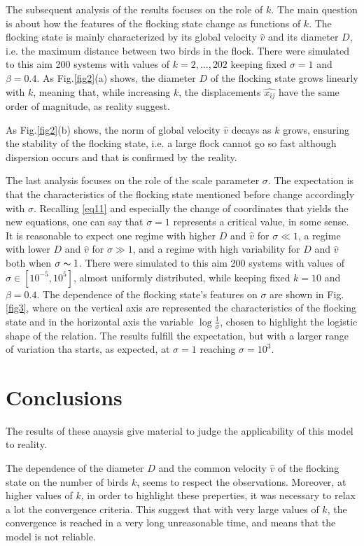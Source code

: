 \documentclass{article} %
\newcounter{late}
\begin{document}
The subsequent analysis of the results focuses on the role of $k$. The main question is about how 
the features of the flocking state change as functions of $k$. The flocking state is mainly
characterized by its global velocity $\widehat{v}$ and its diameter $D$, i.e. the maximum distance 
between two birds in the flock. There were simulated to this aim 200 systems with values of $k=2,...,202$ 
keeping fixed $\sigma=1$ and $\beta=0.4$.
As Fig.\ref{fig2}(a) shows, the diameter $D$ of the flocking state grows linearly with 
$k$, meaning that, 
while increasing $k$,
the displacements $\widehat{x_{ij}}$ have the same order of magnitude, as reality suggest.

As Fig.\ref{fig2}(b) shows, the norm of global velocity $\widehat{v}$ decays as $k$ grows, ensuring the stability 
of the flocking state, i.e. a large flock cannot go so fast although dispersion occurs and that is confirmed 
by the reality.

The last analysis focuses on the role of the scale parameter $\sigma$. The expectation is that 
the characteristics of the flocking state mentioned before change accordingly with $\sigma$. 
Recalling \eqref{eq11} and especially the change of coordinates that yields the new equations,
one can say that $\sigma=1$ represents a critical value, in some sense.
It is reasonable to expect one regime with higher $D$ and $\widehat{v}$ for $\sigma\ll1$, a regime 
with lower $D$ and $\widehat{v}$ for $\sigma\gg1$, and a regime with high variability for 
$D$ and $\widehat{v}$ both when $\sigma\thicksim 1$.
There were simulated to this aim 200 systems with values of $\sigma\in[10^{-5},10^5]$, almost 
uniformly distributed, while keeping fixed $k=10$ and $\beta=0.4$.
The dependence of the flocking state's features on $\sigma$ are shown in Fig.\ref{fig3},
where on the vertical axis are represented
the characteristics of the flocking state and in the horizontal axis the variable $\log\frac{1}{\sigma}$,
chosen to highlight the logistic shape of the relation. The results fulfill the expectation, but with a
larger range of variation tha starts, as expected, at $\sigma=1$ reaching $\sigma=10^3$.

\section {Conclusions}
The results of these anaysis give material to judge the applicability of this model to reality.

The dependence of the diameter $D$ and the common velocity $\widehat{v}$ of the flocking state 
on the number of birds $k$, seems to respect the observations. Moreover, at higher values of $k$,
in order to highlight these preperties, it was necessary to relax a lot the convergence criteria. This suggest
that with very large values of $k$, the convergence is reached in a very long unreasonable time, 
and means that the model is not reliable.
\end{document}
